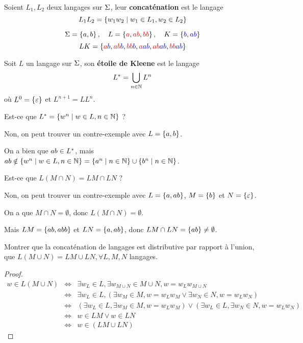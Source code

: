 \begin{definition}
	Soient $L_1, L_2$ deux langages sur $\Sigma$, leur \textbf{concaténation} est le langage
	\[
		L_1L_2 = \left\{w_1w_2 \mid w_1 \in L_1, w_2 \in L_2\right\}
	\]
\end{definition}

\begin{exemple}
	$$ \Sigma = \left\{a, b\right\}, \quad L = \left\{\textcolor{red}{a}, \textcolor{red}{ab}, \textcolor{red}{bb}\right\}, \quad K = \left\{\textcolor{blue}{b}, \textcolor{blue}{ab}\right\} $$
	$$ LK = \left\{\textcolor{red}{a} \textcolor{blue}{b}, \textcolor{red}{ab} \textcolor{blue}{b}, \textcolor{red}{bb} \textcolor{blue}{b}, \textcolor{red}{a} \textcolor{blue}{ab}, \textcolor{red}{ab} \textcolor{blue}{ab}, \textcolor{red}{bb} \textcolor{blue}{ab}\right\} $$
\end{exemple}


\begin{definition}
	Soit $L$ un langage sur $\Sigma$, son \textbf{étoile de Kleene} est le langage
	$$
		L^{*} = \bigcup_{n \in \mathbb{N}} L^n
	$$
	où $L^0 = \left\{\varepsilon\right\}$ et $L^{n+1} = LL^n$.
\end{definition}

\begin{remarque}
	Est-ce que $L^{*} = \left\{w^n \mid w \in L, n \in \mathbb{N}\right\}$ ?

	Non, on peut trouver un contre-exemple avec $L = \left\{a, b\right\}$.

	On a bien que $ab \in L^{*}$, mais $ab \notin \left\{w^n \mid w \in L, n \in \mathbb{N}\right\} = \left\{a^n \mid n \in \mathbb{N}\right\} \cup \left\{b^n \mid n \in \mathbb{N}\right\}$.
\end{remarque}

\begin{remarque}
	Est-ce que $L(M \cap N) = LM \cap LN$ ?

	Non, on peut trouver un contre-exemple avec $L = \left\{a, ab\right\}$, $M = \left\{b\right\}$ et $N = \left\{\varepsilon\right\}$.

	On a que $M \cap N = \emptyset$, donc $L(M \cap N) = \emptyset$.

	Mais $LM = \left\{ab, abb\right\}$ et $LN = \left\{a, ab\right\}$, donc $LM \cap LN = \left\{ab\right\} \neq \emptyset$.
\end{remarque}

\begin{exercice}
	Montrer que la concaténation de langages est distributive par rapport à l'union, \ie que $L(M \cup N) = LM \cup LN, \forall L, M, N$ langages.
\end{exercice}

\begin{proof}
	\begin{eqnarray*}
		w \in L(M \cup N) &\iff& \exists w_L \in L, \exists w_{M \cup N} \in M \cup N, w = w_Lw_{M \cup N} \\
		&\iff& \exists w_L \in L, (\exists w_M \in M, w = w_Lw_M \lor \exists w_N \in N, w = w_Lw_N) \\
		&\iff& (\exists w_L \in L, \exists w_M \in M, w = w_Lw_M) \lor (\exists w_L \in L,\exists w_N \in N, w = w_Lw_N) \\
		&\iff& w \in LM \lor w \in LN  \\
		&\iff& w \in (LM \cup LN)
	\end{eqnarray*}
\end{proof}


